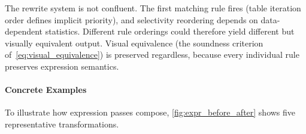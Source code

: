 The rewrite system is not confluent.
The first matching rule fires (table iteration order defines implicit priority), and selectivity reordering depends on data-dependent statistics.
Different rule orderings could therefore yield different but visually equivalent output.
Visual equivalence (the soundness criterion of~\cref{eq:visual_equivalence}) is preserved regardless, because every individual rule preserves expression semantics.



\paragraph{Concrete Examples}
To illustrate how expression passes compose, \cref{fig:expr_before_after} shows five representative transformations.

